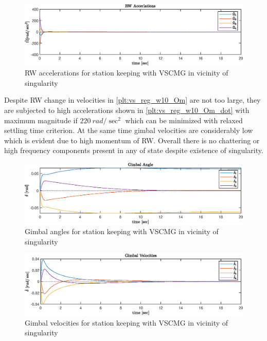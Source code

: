 \begin{figure}[H]
     \centering
    \includegraphics[width=0.9\columnwidth]{figures/plots/VSCMG/vs_reg_w10_Om_dot.eps}
    \caption{RW accelerations for station keeping with VSCMG in vicinity of singularity}
    \label{plt:vs_reg_w10_Om_dot}
\end{figure}
\noindent Despite RW change in velocities in \autoref{plt:vs_reg_w10_Om} are not too large, they are subjected to high accelerations shown in \autoref{plt:vs_reg_w10_Om_dot} with maximum magnitude if  $220\ rad/\sec^2$ which can be minimized with relaxed settling time criterion. At the same time gimbal velocities are considerably low which is evident due to high momentum of RW. Overall there is no chattering or high frequency components present in any of state despite existence of singularity.
\begin{figure}[H]
     \centering
    \includegraphics[width=0.9\columnwidth]{figures/plots/VSCMG/vs_reg_w10_delta.eps}
    \caption{Gimbal angles for station keeping with VSCMG in vicinity of singularity}
    \label{plt:vs_reg_w10_delta}
\end{figure}

\begin{figure}[H]
     \centering
    \includegraphics[width=0.9\columnwidth]{figures/plots/VSCMG/vs_reg_w10_delta_dot.eps}
    \caption{Gimbal velocities for station keeping with VSCMG in vicinity of singularity}
    \label{plt:vs_reg_w10_delta_dot}
\end{figure}

